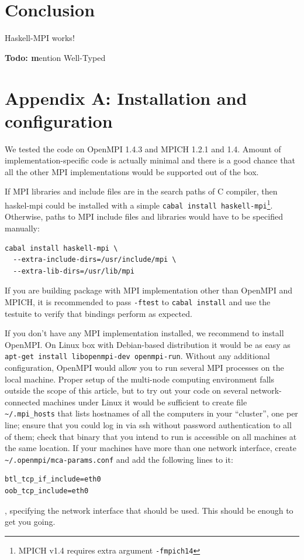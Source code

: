 \documentclass{tmr}
\newcommand{\Todo}[1]{{\textbf{Todo: #1}}}
\begin{document}
\section{Conclusion}

Haskell-MPI works!

\Todo mention Well-Typed

\section{Appendix A: Installation and configuration}
\label{appendix-A}
We tested the code on OpenMPI 1.4.3 and MPICH 1.2.1 and 1.4. Amount of
implementation-specific code is actually minimal and there is a good
chance that all the other MPI implementations would be supported out
of the box.

If MPI libraries and include files are in the search paths of C
compiler, then haskel-mpi could be installed with a simple 
\verb|cabal install haskell-mpi|\footnote{MPICH v1.4 requires extra argument \verb|-fmpich14|}. Otherwise, paths to MPI include
files and libraries would have to be specified manually:
\begin{Verbatim}
cabal install haskell-mpi \
  --extra-include-dirs=/usr/include/mpi \
  --extra-lib-dirs=/usr/lib/mpi
\end{Verbatim}

If you are building package with MPI implementation other than
OpenMPI and MPICH, it is recommended to pass \verb|-ftest| to
\verb|cabal install| and use the testuite to verify that bindings
perform as expected.

If you don't have any MPI implementation installed, we recommend to
install OpenMPI. On Linux box with Debian-based distribution it would
be as easy as \verb|apt-get install libopenmpi-dev openmpi-run|.
Without any additional configuration, OpenMPI would allow you to run
several MPI processes on the local machine. Proper setup of the
multi-node computing environment falls outside the scope of this
article, but to try out your code on several network-connected
machines under Linux it would be sufficient to create file \verb|~/.mpi_hosts|
that lists hostnames of all the computers in your ``cluster'', one per
line; ensure that you could log in via ssh without password
authentication to all of them; check that binary that you intend to
run is accessible on all machines at the same location. If your
machines have more than one network interface, create
\verb|~/.openmpi/mca-params.conf| and add the following lines to it:
\begin{Verbatim}
btl_tcp_if_include=eth0
oob_tcp_include=eth0
\end{Verbatim}
, specifying the network interface that should be used. This should be enough to get you going.


\end{document}
